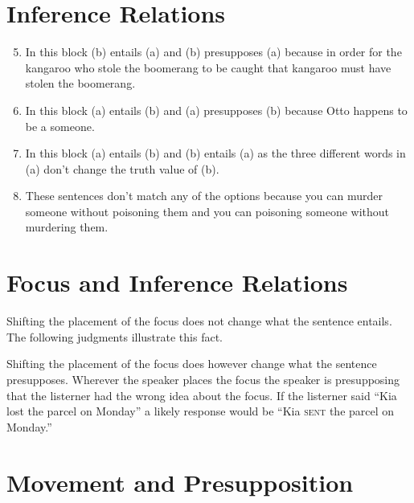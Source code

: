 \documentclass{article}
\begin{document}
\section{Inference Relations}
\begin{enumerate}[label=(\theenumi)]
\setcounter{enumi}{4}
\item In this block (b) entails (a) and (b) presupposes (a) because in order for the
  kangaroo who stole the boomerang to be caught that kangaroo must have stolen
  the boomerang.
\item In this block (a) entails (b) and (a) presupposes (b) because Otto happens to be a
  someone.
\item In this block (a) entails (b) and (b) entails (a) as the three different words
  in (a) don't change the truth value of (b).
\item These sentences don't match any of the options because you can murder
  someone without poisoning them and you can poisoning someone without murdering them.
\end{enumerate}
\section{Focus and Inference Relations}
Shifting the placement of the focus does not change what the sentence entails.
The following judgments illustrate this fact.
\begin{prooftree}
\end{prooftree}
\begin{prooftree}
\end{prooftree}
Shifting the placement of the focus does however change what the sentence
presupposes. Wherever the speaker places the focus the speaker is presupposing
that the listerner had the wrong idea about the focus. If the listerner said
``Kia lost the parcel on Monday'' a likely response would be ``Kia \textsc{sent}
the parcel on Monday.''
\section{Movement and Presupposition}
\end{document}
